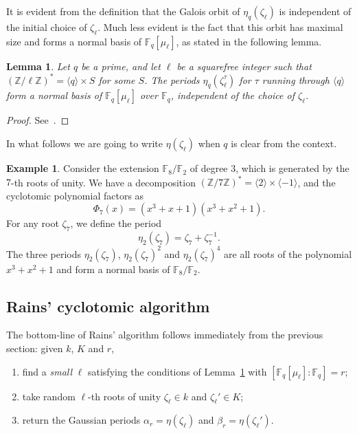 \documentclass[12pt]{article}
\theoremstyle{plain}
\newtheorem{lemma}[theorem]{Lemma}
\theoremstyle{definition}
\newtheorem{example}[theorem]{Example}
\def\Z{\ensuremath{\mathbb{Z}}}
\def\F{\ensuremath{\mathbb{F}}}
\newcounter{algorithm}
\begin{document}
It is evident from the definition that the Galois orbit of
$\eta_q(\zeta_\ell)$ is independent of the initial choice of
$\zeta_\ell$. Much less evident is the fact that this orbit has
maximal size and forms a normal basis of $\F_q[\mu_\ell]$, as stated
in the following lemma.

\begin{lemma}
  \label{th:gaussian}
  Let $q$ be a prime, and let $\ell$ be a squarefree integer such that
  $(\Z/\ell\Z)^\ast = \langle q\rangle \times S$ for some $S$.  The
  periods $\eta_q(\zeta_\ell^\tau)$ for $\tau$ running through
  $\langle q\rangle$ form a normal basis of $\F_q[\mu_\ell]$ over
  $\F_q$, independent of the choice of $\zeta_\ell$.
\end{lemma}
\begin{proof}
  See~\cite[Main Theorem]{feisel1999normal}.
\end{proof}

In what follows we are going to write $\eta(\zeta_\ell)$ when $q$ is
clear from the context.

\begin{example} 
  Consider the extension $\F_8/\F_2$ of degree $3$, which is generated
  by the $7$-th roots of unity. We have a decomposition
  $(\Z/7\Z)^\ast=\langle 2\rangle\times\langle-1\rangle$, and the
  cyclotomic polynomial factors as
  \begin{equation}
    \Phi_7(x) = (x^3 + x + 1) (x^3 + x^2 + 1).
  \end{equation}
  For any root $\zeta_7$, we define the period
  \begin{equation}
    \eta_2(\zeta_7) = \zeta_7+\zeta_7^{-1}.
  \end{equation}
  The three periods $\eta_2(\zeta_7)$, $\eta_2(\zeta_7)^2$ and
  $\eta_2(\zeta_7)^4$ are all roots of the polynomial $x^3+x^2+1$ and
  form a normal basis of $\F_8/\F_2$.
\end{example}

\subsection{Rains' cyclotomic algorithm}

The bottom-line of Rains' algorithm follows immediately from the
previous section: given $k$, $K$ and $r$,
\begin{enumerate}
\item find a \emph{small} $\ell$ satisfying the conditions of
  Lemma~\ref{th:gaussian} with $[\F_q[\mu_\ell]:\F_q]=r$;
\item take random $\ell$-th roots of unity $\zeta_\ell\in k$ and
  $\zeta_\ell'\in K$;
\item return the Gaussian periods $\alpha_r=\eta(\zeta_\ell)$ and
  $\beta_r=\eta(\zeta_\ell')$.
\end{enumerate}
\end{document}
